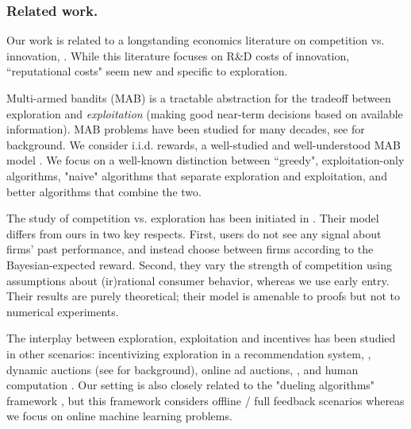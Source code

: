 \documentclass[../competing_bandits.tex]{subfiles}
\begin{document}
\subsubsection{Related work.}
Our work is related to a longstanding economics literature on competition vs. innovation, \eg \cite{Schumpeter-42,barro2004economic,Aghion-QJE05}. While this literature focuses on R\&D costs of innovation, ``reputational costs" seem new and specific to exploration.

Multi-armed bandits (MAB) is a tractable abstraction for the tradeoff between exploration and \emph{exploitation} (making good near-term decisions based on available information). MAB problems have been studied for many decades, see \cite{Bubeck-survey12} for background. We consider i.i.d. rewards, a well-studied and well-understood MAB model \cite{bandits-ucb1}. We focus on a well-known distinction between ``greedy", exploitation-only algorithms, "naive" algorithms that separate exploration and exploitation, and better algorithms that combine the two. 

The study of competition vs. exploration has been initiated in \cite{CompetingBandits-itcs16}. Their model differs from ours in two key respects. First, users do not see any signal about firms' past performance, and instead choose between firms according to the Bayesian-expected reward. Second, they vary the strength of competition using assumptions about (ir)rational consumer behavior, whereas we use early entry. Their results are purely theoretical; their model is amenable to proofs but not to numerical experiments. 

The interplay between exploration, exploitation and incentives has been studied in other scenarios: incentivizing exploration in a recommendation system,
    \eg \cite{Kremer-JPE14,Frazier-ec14,Che-13,ICexploration-ec15,Bimpikis-exploration-ms17},
dynamic auctions
    (see \cite{DynAuctions-survey10} for background),
online ad auctions, \eg
    \cite{MechMAB-ec09,DevanurK09,NSV08,Transform-ec10-jacm,Amin-auctions-nips13},
and human computation
    \cite{RepeatedPA-ec14,Ghosh-itcs13,Krause-www13}.
Our setting is also closely related to the "dueling algorithms" framework \cite{DuelingAlgs-stoc11}, but this framework considers offline / full feedback scenarios whereas we focus on online machine learning problems.
\end{document}
